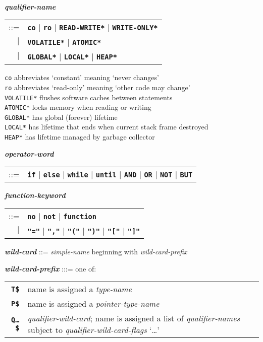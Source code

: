 \documentclass[12pt]{article}
\newcommand{\TT}[1]{{\tt \bfseries #1}}
\newcommand{\ttkey}[1]{{\tt \bfseries #1}}
\newcommand{\emkey}[1]{{\em \bfseries #1}}
\newcommand{\ttakey}[1]{{\tt \bfseries *#1*}}
\newenvironment{indpar}[1][0.3in]%
	{\begin{list}{}%
		     {\setlength{\itemsep}{0in}%
		      \setlength{\topsep}{0in}%
		      \setlength{\parsep}{1ex}%
		      \setlength{\labelwidth}{#1}%
		      \setlength{\leftmargin}{#1}%
		      \addtolength{\leftmargin}{\labelsep}}%
	 \item}%
	{\end{list}}
\begin{document}
\begin{indpar}
\\[1ex]
\emkey{qualifier-name}\label{QUALIFIER-NAME}
    \begin{tabular}[t]{rl}
    ::= & \ttkey{co} $|$ \ttkey{ro} $|$ \ttakey{READ-WRITE}
                     $|$ \ttakey{WRITE-ONLY} \\
    $|$ & \ttakey{VOLATILE} $|$ \ttakey{ATOMIC} \\
    $|$ & \ttakey{GLOBAL} $|$ \ttakey{LOCAL} $|$ \ttakey{HEAP} \\
    \end{tabular}
\begin{indpar}
{\tt co} abbreviates `constant' meaning `never changes' \\
{\tt ro} abbreviates `read-only' meaning `other code may change' \\
{\tt *VOLATILE*} flushes software caches between statements \\
{\tt *ATOMIC*} locks memory when reading or writing \\
{\tt *GLOBAL*} has global (forever) lifetime \\
{\tt *LOCAL*} has lifetime that ends when current stack frame destroyed \\
{\tt *HEAP*} has lifetime managed by garbage collector
\end{indpar}
\emkey{operator-word}
    \begin{tabular}[t]{rl}
    ::= & \TT{if} $|$ \TT{else} $|$ \TT{while} $|$ \TT{until}
                  $|$ \TT{AND} $|$ \TT{OR}
		  $|$ \TT{NOT} $|$ \TT{BUT}
    \end{tabular}

\emkey{function-keyword}
    \begin{tabular}[t]{rl}
    ::= & \TT{no} $|$ \TT{not} $|$ \TT{function} \\
    $|$ & \TT{"="} $|$ \TT{","} $|$ \TT{"("} $|$ \TT{")"} $|$
          \TT{"["} $|$ \TT{"]"}
    \end{tabular}

\emkey{wild-card}\label{WILD-CARD}
    ::= {\em simple-name} beginning with {\em wild-card-prefix}

\emkey{wild-card-prefix}\label{WILD-CARD-PREFIX} :::= one of: \\
\hspace*{0.2in}\begin{tabular}{rp{4in}}
\ttkey{T\$} & name is assigned a {\em type-name} \\
\ttkey{P\$} & name is assigned a {\em pointer-type-name} \\
\ttkey{Q\ldots\$} & {\em qualifier-wild-card}; name is assigned a
                    list of {\em qualifier-names} subject to
		    {\em qualifier-wild-card-flags} `\ldots'\\
\end{tabular}


\end{indpar}
\end{document}
